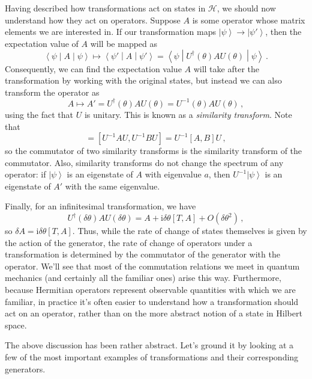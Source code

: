 \documentclass{article}
\theoremstyle{plain}\theoremheaderfont{\normalfont\itshape}\theorembodyfont{\rmfamily}\theoremseparator{.}\newtheorem*{rem}{Remark}\newtheorem*{ex}{Example}\newtheorem*{proof}{Proof}\newtheorem*{altp}{Alternative proof}
\theoremstyle{plain}\theoremheaderfont{\normalfont\bfseries}\theorembodyfont{\rmfamily}\theoremseparator{.}\newtheorem{thm}{Theorem}[section]\newtheorem{lem}[thm]{Lemma}\newtheorem{prop}[thm]{Proposition}\newtheorem*{cor}{Corollary}\newtheorem{defn}[thm]{Definition}\newtheorem{clm}[thm]{Claim}\newtheorem{clminproof}{Claim}
\theoremstyle{break}\theoremheaderfont{\normalfont\itshape}\theorembodyfont{\rmfamily}\theoremseparator{.\medskip}\newtheorem*{proofskip}{Proof}\newtheorem*{exs}{Examples}\newtheorem*{rems}{Remarks}
\theoremstyle{break}\theoremheaderfont{\normalfont\bfseries}\theorembodyfont{\rmfamily}\theoremseparator{.\medskip}\newtheorem{lemskip}[thm]{Lemma}\newtheorem{defnskip}[thm]{Definition}\newtheorem{propskip}[thm]{Proposition}\newtheorem{thmskip}[thm]{Theorem}
\numberwithin{equation}{section}
\newcommand{\ii}{\mathrm{i}}
\newcommand{\ket}[1]{\left| #1 \right\rangle}
\newcommand{\expval}[2]{\left\langle #2 \middle| #1 \middle| #2 \right\rangle}
\newcommand{\hb}{\mathcal{H}}
\begin{document}
    Having described how transformations act on states in \(\hb\), we should now understand how they act on operators. Suppose \(A\) is some operator whose matrix elements we are interested in. If our transformation maps \(\ket{\psi}\to\ket{\psi'}\), then the expectation value of \(A\) will be mapped as
    \begin{equation}
        \expval{A}{\psi}\longmapsto\expval{A}{\psi'}=\expval{U^\dagger(\theta) AU(\theta)}{\psi}\,.
    \end{equation}
    Consequently, we can find the expectation value \(A\) will take after the transformation by working with the original states, but instead we can also transform the operator as
    \begin{equation}\label{transformed_operator}
        A\longmapsto A'= U^\dagger(\theta)AU(\theta)=U^{-1}(\theta)AU(\theta)\,,
    \end{equation}
    using the fact that \(U\) is unitary. This is known as a \textit{similarity transform}. Note that
    \begin{equation}
        [A',B']=[U^{-1}AU,U^{-1}BU]=U^{-1}[A,B]U\,,
    \end{equation}
    so the commutator of two similarity transforms is the similarity transform of the commutator. Also, similarity transforms do not change the spectrum of any operator: if \(\ket{\psi}\) is an eigenstate of \(A\) with eigenvalue \(a\), then \(U^{-1}\ket{\psi}\) is an eigenstate of \(A'\) with the same eigenvalue.

    Finally, for an infinitesimal transformation, we have
    \begin{equation}
        U^\dagger(\delta\theta)AU(\delta\theta)=A+\ii\delta\theta[T,A]+O(\delta\theta^2)\,,
    \end{equation}
    so \(\delta A=\ii\delta\theta[T,A]\). Thus, while the rate of change of states themselves is given by the action of the generator, the rate of change of operators under a transformation is determined by the commutator of the generator with the operator. We'll see that most of the commutation relations we meet in quantum mechanics (and certainly all the familiar ones) arise this way. Furthermore, because Hermitian operators represent observable quantities with which we are familiar, in practice it's often easier to understand how a transformation should act on an operator, rather than on the more abstract notion of a state in Hilbert space.

    The above discussion has been rather abstract. Let's ground it by looking at a few of the most important examples of transformations and their corresponding generators.
\end{document}
